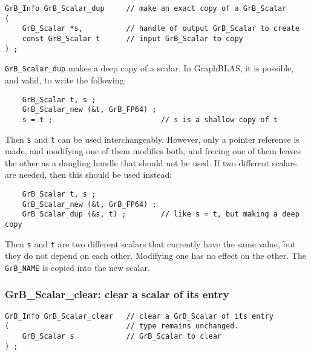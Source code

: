 \documentclass[12pt]{article}
\begin{document}
\begin{mdframed}[userdefinedwidth=6in]
{\footnotesize
\begin{verbatim}
GrB_Info GrB_Scalar_dup     // make an exact copy of a GrB_Scalar
(
    GrB_Scalar *s,          // handle of output GrB_Scalar to create
    const GrB_Scalar t      // input GrB_Scalar to copy
) ;
\end{verbatim}
} \end{mdframed}

\verb'GrB_Scalar_dup' makes a deep copy of a scalar.
In GraphBLAS, it is possible, and valid, to write the following:

    {\footnotesize
    \begin{verbatim}
    GrB_Scalar t, s ;
    GrB_Scalar_new (&t, GrB_FP64) ;
    s = t ;                         // s is a shallow copy of t  \end{verbatim}}

Then \verb's' and \verb't' can be used interchangeably.  However, only a pointer
reference is made, and modifying one of them modifies both, and freeing one of
them leaves the other as a dangling handle that should not be used.
If two different scalars are needed, then this should be used instead:

    {\footnotesize
    \begin{verbatim}
    GrB_Scalar t, s ;
    GrB_Scalar_new (&t, GrB_FP64) ;
    GrB_Scalar_dup (&s, t) ;        // like s = t, but making a deep copy \end{verbatim}}

Then \verb's' and \verb't' are two different scalars that currently have
the same value, but they do not depend on each other.  Modifying one has no
effect on the other.
The \verb'GrB_NAME' is copied into the new scalar.

\subsubsection{{\sf GrB\_Scalar\_clear:} clear a scalar of its entry}
\label{scalar_clear}

\begin{mdframed}[userdefinedwidth=6in]
{\footnotesize
\begin{verbatim}
GrB_Info GrB_Scalar_clear   // clear a GrB_Scalar of its entry
(                           // type remains unchanged.
    GrB_Scalar s            // GrB_Scalar to clear
) ;
\end{verbatim}
} \end{mdframed}
\end{document}
